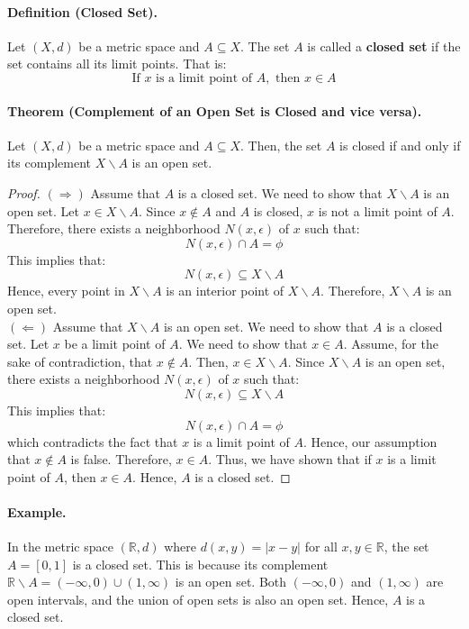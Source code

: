 \documentclass[openany]{book}
\numberwithin{equation}{section}
\begin{document}
\paragraph{Definition (Closed Set).}

    Let $(X, d)$ be a metric space and $A \subseteq X$. The set $A$ is called a \textbf{closed set} if the set contains all its limit points. That is:
    $$\text{If } x \text{ is a limit point of } A, \text{ then } x \in A$$
\par
\paragraph{Theorem (Complement of an Open Set is Closed and vice versa).}

    Let $(X, d)$ be a metric space and $A \subseteq X$. Then, the set $A$ is closed if and only if its complement $X \backslash A$ is an open set.
\par
\begin{proof}
    $(\Rightarrow)$ Assume that $A$ is a closed set. We need to show that $X \backslash A$ is an open set. Let $x \in X \backslash A$. Since $x \notin A$ and $A$ is closed, $x$ is not a limit point of $A$. Therefore, there exists a neighborhood $N(x, \epsilon)$ of $x$ such that:
    $$N(x, \epsilon) \cap A = \phi$$
    This implies that:
    $$N(x, \epsilon) \subseteq X \backslash A$$
    Hence, every point in $X \backslash A$ is an interior point of $X \backslash A$. Therefore, $X \backslash A$ is an open set. \\
    $(\Leftarrow)$ Assume that $X \backslash A$ is an open set. We need to show that $A$ is a closed set. Let $x$ be a limit point of $A$. We need to show that $x \in A$. Assume, for the sake of contradiction, that $x \notin A$. Then, $x \in X \backslash A$. Since $X \backslash A$ is an open set, there exists a neighborhood $N(x, \epsilon)$ of $x$ such that:
    $$N(x, \epsilon) \subseteq X \backslash A$$
    This implies that:
    $$N(x, \epsilon) \cap A = \phi$$
    which contradicts the fact that $x$ is a limit point of $A$. Hence, our assumption that $x \notin A$ is false. Therefore, $x \in A$. Thus, we have shown that if $x$ is a limit point of $A$, then $x \in A$. Hence, $A$ is a closed set.
\end{proof}
\paragraph{Example.}

    In the metric space $(\mathbb{R}, d)$ where $d(x, y) = |x - y|$ for all $x, y \in \mathbb{R}$, the set $A = [0, 1]$ is a closed set. This is because its complement $\mathbb{R} \backslash A = (-\infty, 0) \cup (1, \infty)$ is an open set. Both $(-\infty, 0)$ and $(1, \infty)$ are open intervals, and the union of open sets is also an open set. Hence, $A$ is a closed set.
\par
\end{document}
